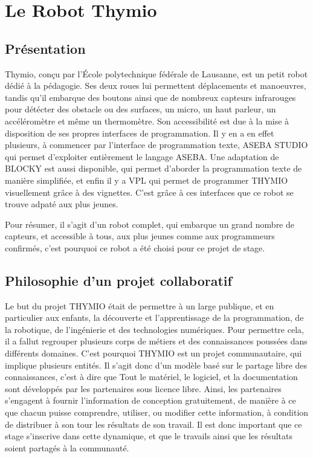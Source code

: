 \documentclass[a4paper, 12pt]{report}
\begin{document}
\chapter{Le Robot Thymio}
\section{Présentation}

Thymio, conçu par l’École polytechnique fédérale de Lausanne, est un petit robot dédié à la pédagogie. Ses deux roues lui permettent déplacements et manoeuvres, tandis qu'il embarque des boutons ainsi que de nombreux capteurs infrarouges pour détécter des obstacle ou des surfaces, un micro, un haut parleur, un accéléromètre et même un thermomètre. Son accessibilité est due à la mise à disposition de ses propres interfaces de programmation. Il y en a en effet plusieurs, à commencer par l'interface de programmation texte, ASEBA STUDIO qui permet d'exploiter entièrement le langage ASEBA. Une adaptation de BLOCKY est aussi disponible, qui permet d'aborder la programmation texte de manière simplifiée, et enfin il y a VPL qui permet de programmer THYMIO visuellement grâce à des vignettes. C'est grâce à ces interfaces que ce robot se trouve adpaté aux plus jeunes.

Pour résumer, il s'agit d'un robot complet, qui embarque un grand nombre de capteurs, et accessible à tous, aux plus jeunes comme aux programmeurs confirmés, c'est pourquoi ce robot a été choisi pour ce projet de stage.

\section{Philosophie d'un projet collaboratif}
Le but du projet THYMIO était de permettre à un large publique, et en particulier aux enfants, la découverte et l'apprentissage de la programmation, de la robotique, de l'ingénierie et des technologies numériques. Pour permettre cela, il a fallut regrouper plusieurs corps de métiers et des connaissances poussées dans différents domaines. C'est pourquoi THYMIO est un projet communautaire, qui implique plusieurs entités. Il s'agit donc d'un modèle basé sur le partage libre des connaissances, c'est à dire que Tout le matériel, le logiciel, et la documentation sont développés par les partenaires sous licence libre. Ainsi, les partenaires s'engagent à fournir l'information de conception gratuitement, de manière à ce que chacun puisse comprendre, utiliser, ou modifier cette information, à condition de distribuer à son tour les résultats de son travail. Il est donc important que ce stage s'inscrive dans cette dynamique, et que le travails ainsi que les résultats soient partagés à la communauté.
\end{document}
